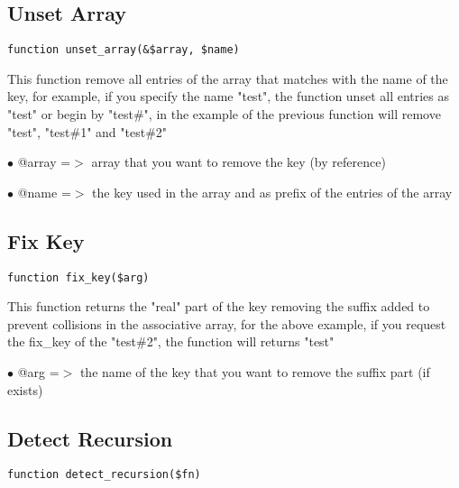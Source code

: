 \documentclass[a4paper]{book}
\begin{document}
\hypertarget{toc280}{}
\subsection{Unset Array}

\begin{lstlisting}
function unset_array(&$array, $name)
\end{lstlisting}

This function remove all entries of the array that matches with the name of
the key, for example, if you specify the name "test", the function unset all
entries as "test" or begin by "test\#", in the example of the previous function
will remove "test", "test\#1" and "test\#2"

\begin{compactitem}
\item[\color{myblue}$\bullet$] @array =$>$ array that you want to remove the key (by reference)
\item[\color{myblue}$\bullet$] @name  =$>$ the key used in the array and as prefix of the entries of the array
\end{compactitem}

\hypertarget{toc281}{}
\subsection{Fix Key}

\begin{lstlisting}
function fix_key($arg)
\end{lstlisting}

This function returns the "real" part of the key removing the suffix added to
prevent collisions in the associative array, for the above example, if you request
the fix\_key of the "test\#2", the function will returns "test"

\begin{compactitem}
\item[\color{myblue}$\bullet$] @arg =$>$ the name of the key that you want to remove the suffix part (if exists)
\end{compactitem}

\hypertarget{toc282}{}
\subsection{Detect Recursion}

\begin{lstlisting}
function detect_recursion($fn)
\end{lstlisting}
\end{document}
